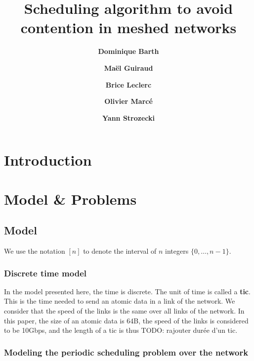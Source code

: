 \documentclass[english]{article}
\begin{document}
\title{Scheduling algorithm to avoid contention in meshed networks}
 

\newcommand{\todo}[1]{{\color{red} TODO: {#1}}}
\newcommand{\spall}{\textsc{SPALL}\xspace}
\newtheorem{theorem}{Theorem}
\newtheorem{lemma}[theorem]{Lemma}
\newtheorem{definition}{Definition}
\newtheorem{corollary}{Corollary}
\author[1]{\bf{ {Dominique Barth}}}
\author[1,2]{\bf{ {Ma\"el Guiraud}}}
\author[2]{\bf{ {Brice Leclerc}}}
\author[2]{\bf{ {Olivier Marc\'e}}}
\author[1]{\bf{ {Yann Strozecki}}}




\maketitle

\section*{Introduction}
\section{Model \& Problems}
\subsection{Model}

We use the notation $[n]$ to denote the interval of $n$ integers $\{0,\dots,n-1\}$.

  \subsubsection{Discrete time model}
  In the model presented here, the time is discrete. The unit of time is called a {\bf tic}. This is the time needed to send an atomic data in a link of the network. We consider that the speed of the links is the same over all links of the network. 
  In this paper, the size of an atomic data is 64B, the speed of the links is considered to be 10Gbps, and the length of a tic is thus 
  \todo{rajouter durée d'un tic}.

  \subsubsection{Modeling the periodic scheduling problem over the network}
\end{document}
